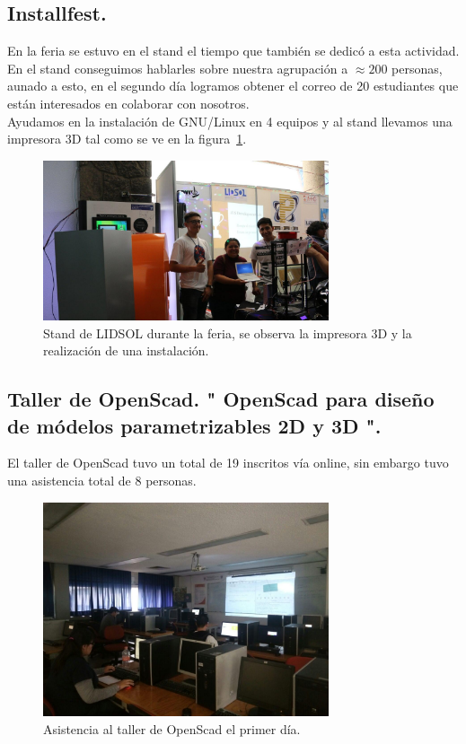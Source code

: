 \documentclass[a4paper,11pt]{article}                 %
\begin{document}
  \subsection{Installfest.}  
  En la feria se estuvo en el stand el tiempo que también se dedicó a esta actividad.\\ En el stand conseguimos hablarles sobre nuestra agrupación a $\approx 200$ personas, aunado a esto, en el segundo día logramos obtener el correo de 20 estudiantes que están interesados en colaborar con nosotros.\\ Ayudamos en la instalación de GNU/Linux en 4 equipos y al stand llevamos una impresora 3D tal como se ve en la figura~\ref{fig:installfest-01}.
    \begin{figure}[H]
    \begin{center}
      \includegraphics[width=0.75\textwidth]{images/installfest-01}
      \caption{Stand de LIDSOL durante la feria, se observa la impresora 3D y la realización de una instalación.}
      \label{fig:installfest-01}
    \end{center}
  \end{figure}
  
  \subsection{Taller de OpenScad. " {OpenScad} para diseño de módelos parametrizables 2D y 3D ".}
  
  El taller de OpenScad tuvo un total de 19 inscritos vía online, sin embargo tuvo una asistencia total de 8 personas.
       \begin{figure}[H]
    \begin{center}
      \includegraphics[width=0.75\textwidth]{images/openscad-01}
      \caption{Asistencia al taller de OpenScad el primer día.}
      \label{fig:openscad-01}
    \end{center}
  \end{figure}
  
\end{document}
